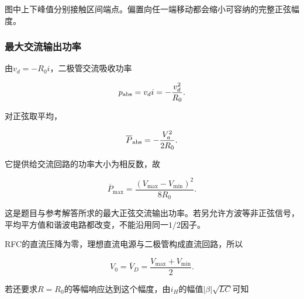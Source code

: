 \documentclass[12pt,a4paper,fontset=fandol]{ctexart}
\begin{document}
\begin{center}
\begin{minipage}{\linewidth}
\centering\begingroup{}
\ifdim\wd\diagrambox>.88\linewidth
\sbox{\diagrambox}{\resizebox{.88\linewidth}{!}{\usebox{\diagrambox}}}\fi
\ifdim\ht\diagrambox>.38\textheight
\resizebox{!}{.38\textheight}{\usebox{\diagrambox}}
\else\usebox{\diagrambox}\fi
\par{}\endgroup\end{minipage}\end{center}

图中上下峰值分别接触区间端点。偏置向任一端移动都会缩小可容纳的完整正弦幅度。

\subsubsection{最大交流输出功率}\label{ux6700ux5927ux4ea4ux6d41ux8f93ux51faux529fux7387}

由\(v_d=-R_0i\)，二极管交流吸收功率

\[
p_{\rm abs}=v_di=-\frac{v_d^2}{R_0}.
\]

对正弦取平均，

\[
\overline P_{\rm abs}=-\frac{V_a^2}{2R_0}.
\]

它提供给交流回路的功率大小为相反数，故

\[
\boxed{
\overline P_{\max}
=\frac{(V_{\max}-V_{\min})^2}{8R_0}}.
\]

这是题目与参考解答所求的最大正弦交流输出功率。若另允许方波等非正弦信号，平均平方值和谐波电路都改变，不能沿用同一\(1/2\)因子。

RFC的直流压降为零，理想直流电源与二极管构成直流回路，所以

\[
\boxed{V_0=\overline V_D
=\frac{V_{\max}+V_{\min}}2}.
\]

若还要求\(R=R_0\)的等幅响应达到这个幅度，由\(i_H\)的幅值\(|\beta|\sqrt{LC}\)可知
\end{document}
